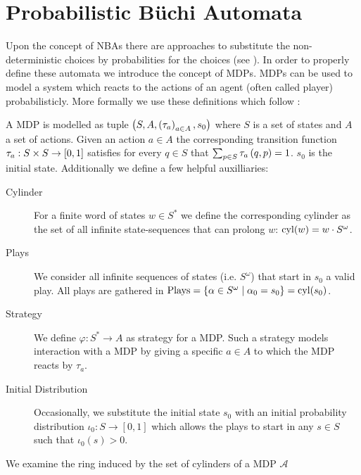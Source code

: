 \section{Probabilistic Büchi Automata}
Upon the concept of \acp{NBA} there are approaches to substitute the
non-deterministic choices by probabilities for the choices
(see \cite{RecOmeLangProbAuto,DecProblemsForProbAuto,Groesser}). In order to
properly define these automata we introduce the concept of \aclp{MDP}.
\aclp*{MDP} can be used to model a system which reacts to the actions of an
agent (often called player) probabilisticly.
More formally we use these definitions which follow \cite{RandAutoInfTrees}:
\begin{definition}
  A \acl*{MDP} is modelled as tuple
  $\left(S, A, \left(\tau_{a}\right)_{a\in A}, s_{0}\right)$ where $S$ is a set of states
  and $A$ a set of actions. Given an action $a\in A$ the corresponding
  transition function $\tau_{a}:S\times S\rightarrow \left[0,1\right]$ satisfies
  for every $q\in S$ that $\sum_{p\in S}\tau_{a}\left(q,p\right) = 1$.
  $s_{0}$ is the initial state. Additionally we define a few helpful
  auxilliaries:
  \begin{description}
    \item [Cylinder] For a finite word of states $w\in S^{*}$ we define the
      corresponding cylinder as the set of all infinite state-sequences
      that can prolong $w$: $\operatorname{cyl}(w) = w\cdot S^{\omega}$.
    \item [Plays] We consider all infinite sequences of states
      (i.e. $S^{\omega}$) that start in $s_{0}$ a valid play. All plays
      are gathered in $\operatorname{Plays} = \left\{
        \alpha\in S^{\omega}\mid \alpha_{0} = s_{0}\right\} = \operatorname{cyl}(s_{0})$.
    \item [Strategy] We define $\varphi:S^{*}\rightarrow A$ as strategy for
      a \ac{MDP}. Such a strategy models interaction with a \ac{MDP} by
      giving a specific $a\in A$ to which the \ac{MDP} reacts by $\tau_{a}$.
    \item [Initial Distribution] Occasionally, we substitute the initial state
      $s_{0}$ with an initial probability distribution
      $\iota_{0}:S\rightarrow[0,1]$ which allows the plays to start in any
      $s\in S$ such that $\iota_{0}(s) > 0$.
  \end{description}
  \label{def:mdp}
\end{definition}
We examine the ring induced by the set of cylinders of a \ac{MDP} $\mathcal{A}$

